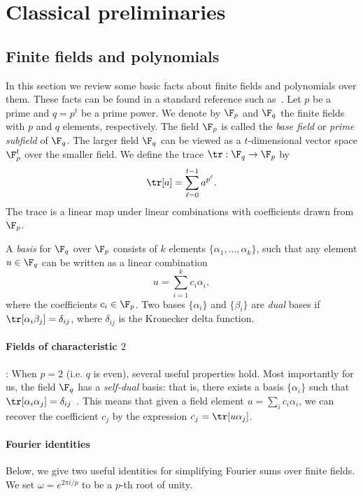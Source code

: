 \section{Classical preliminaries}  \label{sec:prelims}

\subsection{Finite fields and polynomials}
In this section we review some basic facts about finite fields and
polynomials over them. These facts can be found in a standard
reference such as~\cite{MBG+13}. Let $p$ be a prime and $q = p^t$ be a prime power. We denote by $\F_p$
and $\F_q$ the finite fields with $p$ and $q$ elements,
respectively. The field $\F_p$ is called the \emph{base field} or
\emph{prime subfield} of $\F_q$. The larger field $\F_q$ can be viewed as a
$t$-dimensional vector space $\F_p^{t}$ over the smaller field.
We define the trace $\tr: \F_q \to \F_p$ by
\[ \tr[a]  = \sum_{\ell=0}^{t-1} a^{p^\ell}. \]
The trace is a linear map under linear combinations with coefficients
drawn from $\F_p$. 

A \emph{basis} for
$\F_q$ over $\F_p$ consists of $k$ elements $\{\alpha_1, \dots,
\alpha_k\}$, such that any element $u \in \F_q$ can be written as a
linear combination
\[ u = \sum_{i=1}^k c_i \alpha_i, \]
where the coefficients $c_i \in \F_p$. Two bases $\{\alpha_i\}$ and
$\{\beta_i\}$ are \emph{dual} bases if $\tr[\alpha_i \beta_j]
= \delta_{ij}$, where $\delta_{ij}$ is the Kronecker delta function.

\paragraph{Fields of characteristic $2$}:
When $p =2$ (i.e. $q$ is even), several useful properties hold. Most
importantly for us, the field $\F_q$ has a \emph{self-dual} basis: that is, there exists a basis $\{\alpha_i\}$ such
that $\tr[\alpha_i \alpha_j] =
\delta_{ij}$~\cite[Theorem 1.9]{MBG+13}. This means that
given a field element $u = \sum_i c_i \alpha_i$, we can recover the
coefficient $c_j$ by the expression $c_j = \tr[u \alpha_j]$.

\paragraph{Fourier identities}
Below, we give two useful identities for simplifying Fourier sums over
finite fields. We set $\omega = e^{2\pi i / p}$ to be a $p$-th root of unity.

